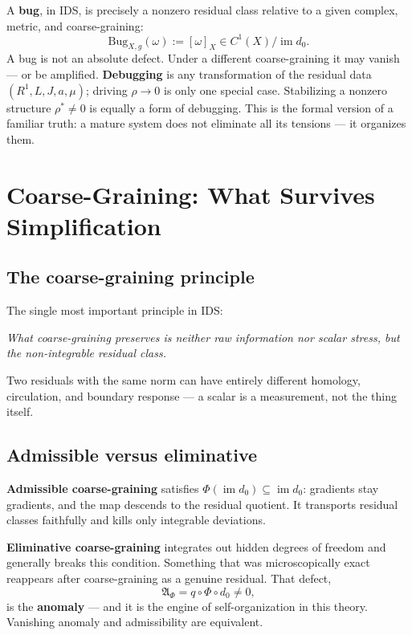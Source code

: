 \documentclass[11pt,a4paper]{article}
\newenvironment{canonbox}{\begin{mdframed}[style=canon]\itshape}{\end{mdframed}}
\theoremstyle{plain}
\begin{document}
A \textbf{bug}, in IDS, is precisely a nonzero residual class relative to a given complex, metric, and coarse-graining:
\begin{equation}
\mathrm{Bug}_{X,g}(\omega):=[\omega]_X\in C^1(X)/\operatorname{im}d_0.
\end{equation}
A bug is not an absolute defect. Under a different coarse-graining it may vanish --- or be amplified. \textbf{Debugging} is any transformation of the residual data $(R^1,L,J,a,\mu)$; driving $\rho\to0$ is only one special case. Stabilizing a nonzero structure $\rho^\ast\ne0$ is equally a form of debugging. This is the formal version of a familiar truth: a mature system does not eliminate all its tensions --- it organizes them.

\section{Coarse-Graining: What Survives Simplification}\label{sec:coarse}

\subsection{The coarse-graining principle}

The single most important principle in IDS:

\begin{canonbox}
What coarse-graining preserves is neither raw information nor scalar stress, but the non-integrable residual class.
\end{canonbox}

Two residuals with the same norm can have entirely different homology, circulation, and boundary response --- a scalar is a measurement, not the thing itself.

\subsection{Admissible versus eliminative}

\textbf{Admissible coarse-graining} satisfies $\Phi(\operatorname{im}d_0)\subseteq\operatorname{im}d_0$: gradients stay gradients, and the map descends to the residual quotient. It transports residual classes faithfully and kills only integrable deviations.

\textbf{Eliminative coarse-graining} integrates out hidden degrees of freedom and generally breaks this condition. Something that was microscopically exact reappears after coarse-graining as a genuine residual. That defect,
\begin{equation}
\mathfrak A_\Phi=q\circ\Phi\circ d_0\ne0,
\end{equation}
is the \textbf{anomaly} --- and it is the engine of self-organization in this theory. Vanishing anomaly and admissibility are equivalent.
\end{document}
